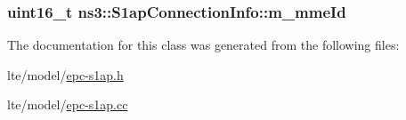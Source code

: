 \subsubsection[{\texorpdfstring{m\+\_\+mme\+Id}{m_mmeId}}]{\setlength{\rightskip}{0pt plus 5cm}uint16\+\_\+t ns3\+::\+S1ap\+Connection\+Info\+::m\+\_\+mme\+Id}\hypertarget{classns3_1_1S1apConnectionInfo_a886b38983459e8939f5e0fe983512415}{}\label{classns3_1_1S1apConnectionInfo_a886b38983459e8939f5e0fe983512415}


The documentation for this class was generated from the following files\+:\begin{DoxyCompactItemize}
\item 
lte/model/\hyperlink{epc-s1ap_8h}{epc-\/s1ap.\+h}\item 
lte/model/\hyperlink{epc-s1ap_8cc}{epc-\/s1ap.\+cc}\end{DoxyCompactItemize}
